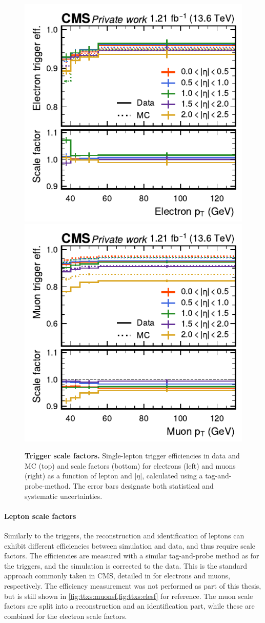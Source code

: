 \begin{figure}[t]
    \centering
    \includegraphics[width=0.49 \textwidth]{figures/ttxs/scalefactors/trigger_eff_e.pdf}
    \hfill
    \includegraphics[width=0.49 \textwidth]{figures/ttxs/scalefactors/trigger_eff_mu.pdf}
    \caption{\textbf{Trigger scale factors.} Single-lepton trigger efficiencies in data and MC (top) and scale factors (bottom) for electrons (left) and muons (right) as a function of lepton \pt and $|\eta|$, calculated using a tag-and-probe-method. The error bars designate both statistical and systematic uncertainties.}
    \label{fig:ttxs:triggersf}
\end{figure}

\paragraph{Lepton scale factors}

Similarly to the triggers, the reconstruction and identification of leptons can exhibit different efficiencies between simulation and data, and thus require scale factors. 
The efficiencies are measured with a similar tag-and-probe method as for the triggers, and the simulation is corrected to the data. This is the standard approach commonly taken in CMS, detailed in  for electrons and muons, respectively. %
The efficiency measurement was not performed as part of this thesis, but is still shown in \cref{fig:ttxs:muonsf,fig:ttxs:elesf} for reference. The muon scale factors are split into a reconstruction and an identification part, while these are combined for the electron scale factors.  

